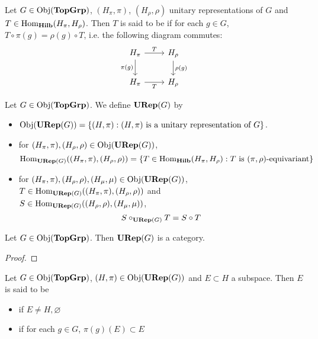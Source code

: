 \documentclass{book}
\begin{document}
	\begin{defn}
		Let $G \in \operatorname{Obj}(\operatorname*{\text{\textbf{TopGrp}}})$, $(H_{\pi}, \pi)$, $(H_{\rho}, \rho)$ unitary representations of $G$ and $T \in \operatorname{Hom}_{\operatorname*{\text{\textbf{Hilb}}}}(H_{\pi}, H_{\rho})$. Then $T$ is said to be  if for each $g \in G$, $T \circ \pi(g) = \rho(g) \circ T$, i.e. the following diagram commutes:
		\[
		\begin{tikzcd}
			H_{\pi} \arrow[r, "T"] \arrow[d, "\pi(g)"']  & H_{\rho}  \arrow[d, "\rho(g)"] \\
			H_{\pi} \arrow[r, "T"']                   & H_{\rho}
		\end{tikzcd}
		\]
	\end{defn}

	\begin{defn} \ld{13009}
		Let $G \in \operatorname{Obj}(\operatorname*{\text{\textbf{TopGrp}}})$. We define $\operatorname*{\text{\textbf{URep}}}(G)$ by 
		\begin{itemize}
			\item $\operatorname{Obj}(\operatorname*{\text{\textbf{URep}}}(G)) = \{(H, \pi): (H, \pi) \text{ is a unitary representation of $G$}\}$.
			\item for $(H_{\pi}, \pi),(H_{\rho}, \rho) \in \operatorname{Obj}(\operatorname*{\text{\textbf{URep}}}(G))$, 
			$$\operatorname{Hom}_{\operatorname*{\text{\textbf{URep}}}(G)}((H_{\pi}, \pi), (H_{\rho}, \rho)) = \{T \in \operatorname{Hom}_{\operatorname*{\text{\textbf{Hilb}}}}(H_{\pi}, H_{\rho}): T \text{ is $(\pi, \rho)$-equivariant} \}$$
			\item for $(H_{\pi}, \pi), (H_{\rho}, \rho), (H_{\mu}, \mu) \in \operatorname{Obj}(\operatorname*{\text{\textbf{URep}}}(G))$, $T \in \operatorname{Hom}_{\operatorname*{\text{\textbf{URep}}}(G)}((H_{\pi}, \pi), (H_{\rho}, \rho))$ and \\
			$S \in  \operatorname{Hom}_{\operatorname*{\text{\textbf{URep}}}(G)}((H_{\rho}, \rho), (H_{\mu}, \mu))$, 
			$$S \circ_{\operatorname*{\text{\textbf{URep}}}(G)} T = S \circ T$$
		\end{itemize}
	\end{defn}
	
	\begin{ex}
		Let $G \in \operatorname{Obj}(\operatorname*{\text{\textbf{TopGrp}}})$. Then $\operatorname*{\text{\textbf{URep}}}(G)$ is a category.
	\end{ex}
	
	\begin{proof}
		\tcb{FINISH!!!}
	\end{proof}

	\begin{defn}
		Let $G \in \operatorname{Obj}(\operatorname*{\text{\textbf{TopGrp}}})$, $(H, \pi) \in \operatorname{Obj}(\operatorname*{\text{\textbf{URep}}}(G))$ and $E \subset H$ a subspace. Then $E$ is said to be 
		\begin{itemize}
			\item {} if $E \neq H, \varnothing$
			\item {} if for each $g \in G$, $\pi(g)(E) \subset E$
		\end{itemize} 
	\end{defn}
\end{document}

